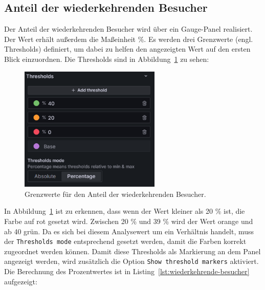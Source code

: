 \subsection{Anteil der wiederkehrenden Besucher}
Der \glqq Anteil der wiederkehrenden Besucher\grqq{} wird über ein Gauge-Panel realisiert. Der Wert erhält außerdem die Maßeinheit \%. Es werden drei Grenzwerte (engl. Thresholds) definiert, um dabei zu helfen den angezeigten Wert auf den ersten Blick einzuordnen. Die Thresholds sind in Abbildung~\ref{fig:thresholds} zu sehen: 

\begin{figure}[H]
    \centering
    \includegraphics[width=0.6\textwidth, keepaspectratio]{images/thresholds.png}
    \caption{Grenzwerte für den \glqq Anteil der wiederkehrenden Besucher\grqq{}.}
    \label{fig:thresholds}
\end{figure}

In Abbildung~\ref{fig:thresholds} ist zu erkennen, dass wenn der Wert kleiner als 20 \% ist, die Farbe auf rot gesetzt wird. Zwischen 20 \% und 39 \% wird der Wert orange und ab 40 grün. Da es sich bei diesem Analysewert um ein Verhältnis handelt, muss der \texttt{Thresholds mode} entsprechend gesetzt werden, damit die Farben korrekt zugeordnet werden können. Damit diese Thresholds als Markierung an dem Panel angezeigt werden, wird zusätzlich die Option \texttt{Show threshold markers} aktiviert. Die Berechnung des Prozentwertes ist in Listing~\ref{lst:wiederkehrende-besucher} aufgezeigt:

\begin{figure}[H]
    \centering
    \begin{minipage}{\textwidth}
        
    \end{minipage}
\end{figure}

